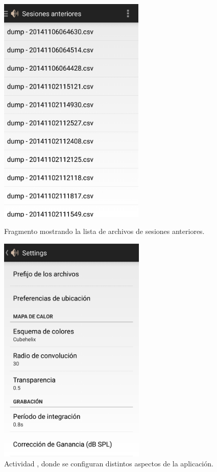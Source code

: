 \begin{figure}[h] \centering%
 \begin{minipage}{0.45\textwidth}\centering%
    \includegraphics[height=11cm]{graphs/sessions.png} \caption{Fragmento  mostrando la lista de archivos de sesiones anteriores.}\label{fig:screen:sessions}%
 \end{minipage}
 \hfill
\begin{minipage}{0.45\textwidth}\centering%
 \includegraphics[height=11cm]{graphs/settings.png} \caption{Actividad , donde se configuran distintos aspectos de la aplicación.}\label{fig:screen:settings}
\end{minipage}
\end{figure}

